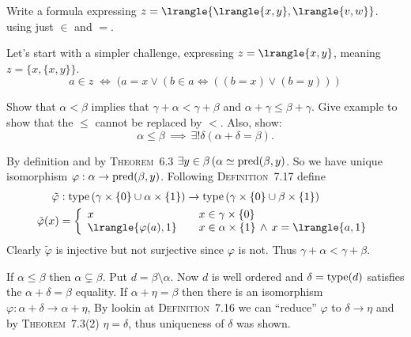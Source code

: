 \begin{enumerate}

\begin{excopy}
Write a formula expressing
\(z = \lrangle{\lrangle{x, y}, \lrangle{v, w}}\).
using just \(\in\) and $=$.
\end{excopy}

Let's start with a simpler challenge, expressing \(z = \lrangle{x, y}\),
meaning \(z = \{x, \{x,y\}\}\).
\begin{equation*}
 a \in z\;\iff\; (a=x \lor (b \in a \iff ((b=x) \lor (b=y)))
\end{equation*}
\unfinished

\begin{excopy}
Show that
\(\alpha < \beta\) implies that \(\gamma + \alpha < \gamma + \beta\)
and \(\alpha + \gamma \leq \beta + \gamma\).
Give
 example to show that the \(\leq\) cannot be replaced by $<$. Also, show:
\begin{equation*}
 \alpha \leq \beta \,\implies\, \exists!\delta(\alpha + \delta = \beta).
\end{equation*}
\end{excopy}
By definition and by \textsc{Theorem}~6.3
\(\exists y\in\beta\,(\alpha \simeq \mathop{\rm pred}\nolimits(\beta,y)\).
So we have unique isomorphism
\(\varphi: \alpha \to \mathop{\rm pred}\nolimits(\beta,y)\).
Following \textsc{Definition}~7.17
define
\begin{align*}
\tilde{\varphi} &:
  \type\left(\gamma\times\{0\}\cup \alpha\times\{1\}\right)
  \to
  \type\left(\gamma\times\{0\}\cup \beta\times\{1\}\right) \\
\tilde{\varphi}(x) &=
  \left\{
  \begin{array}{ll}
    x &\quad x\in \gamma\times\{0\} \\
    \lrangle{\varphi(a),1} &\quad x \in\alpha\times\{1\}\,\land\,x=\lrangle{a,1}
  \end{array}
  \right.
\end{align*}
Clearly \(\tilde{\varphi}\) is injective but not surjective
since \(\varphi\) is not. Thus \(\gamma + \alpha < \gamma + \beta\).

If \(\alpha\leq\beta\) then \(\alpha \subsetneq \beta\).
Put \(d=\beta \setminus \alpha\).
Now $d$ is well ordered and \(\delta = \mathop{\rm type}\nolimits(d)\)
satisfies the \(\alpha + \delta = \beta\) equality.
If \(\alpha + \eta = \beta\)
then there is an isomorphism \(\varphi: \alpha + \delta \to \alpha + \eta\),
By lookin at \textsc{Definition}~7.16 we can ``reduce''
\(\varphi\) to \(\delta \to \eta\) and by \textsc{Theorem}~7.3(2)
\(\eta = \delta\), thus uniqueness of \(\delta\) was shown.


\end{enumerate}
